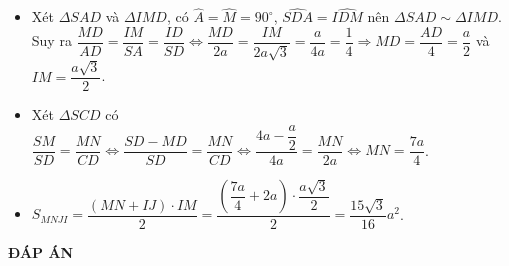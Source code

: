\begin{bt}
{\begin{itemize}
	        \item Xét $\Delta SAD $ và $\Delta IMD$, có $\widehat{A} = \widehat{M} = 90^{\circ}$, $\widehat{SDA} = \widehat{IDM}$ nên  $\Delta SAD \sim \Delta IMD$.\\
	        Suy ra $\dfrac{MD}{AD} = \dfrac{IM}{SA} = \dfrac{ID}{SD}  \Leftrightarrow  \dfrac{MD}{2a} = \dfrac{IM}{2a\sqrt{3}}  =\dfrac{a}{4a} = \dfrac{1}{4} \Rightarrow MD = \dfrac{AD}{4} = \dfrac{a}{2}$ và $IM = \dfrac{a\sqrt{3}}{2}$.
	        \item Xét $\Delta SCD$ có $\dfrac{SM}{SD} = \dfrac{MN}{CD} \Leftrightarrow \dfrac{SD - MD}{SD} = \dfrac{MN}{CD}  \Leftrightarrow \dfrac{4a -\dfrac{a}{2}}{4a} = \dfrac{MN}{2a} \Leftrightarrow MN = \dfrac{7a}{4}$.
	        \item $S_{MNJI} = \dfrac{(MN + IJ) \cdot IM}{ 2} = \dfrac{\left( \dfrac{7a}{4} + 2a \right) \cdot \dfrac{a\sqrt{3}}{2} }{2} = \dfrac{15 \sqrt{3}}{16}a^2$.
	        \end{itemize}
	}
\end{bt}
\newpage
\begin{center}
	\textbf{ĐÁP ÁN}
\end{center}
\begin{multicols}{10}
	
\end{multicols}
